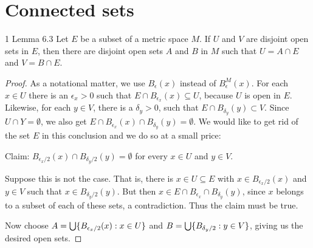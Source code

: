 \section{Connected sets}


\begin{exercise}{1 Lemma 6.3}
Let $E$ be a subset of a metric space $M$.
If $U$ and $V$ are disjoint open sets in $E$, then there are disjoint open sets $A$ and $B$ in $M$ such that $U=A\cap E$ and $V=B\cap E$.
\end{exercise}
\begin{proof}
As a notational matter, we use $B_\epsilon(x)$ instead of $B_\epsilon^M(x)$.
For each $x\in U$ there is an $\epsilon_x>0$ such that $E\cap B_{\epsilon_x}(x)\subseteq U$, because $U$ is open in $E$.
Likewise, for each $y\in V$, there is a $\delta_y>0$, such that $E\cap B_{\delta_y}(y)\subset V$.
Since $U\cap Y = \emptyset$, we also get $E\cap B_{\epsilon_x}(x)\cap B_{\delta_y}(y) = \emptyset$.
We would like to get rid of the set $E$ in this conclusion and we do so at a small price:

Claim: $B_{\epsilon_x/2}(x)\cap B_{\delta_y/2}(y) = \emptyset$ for every $x\in U$ and $y\in V$. 

Suppose this is not the case.
That is, there is $x\in U\subseteq E$ with $x\in B_{\epsilon_x/2}(x)$ and $y\in V$ such that $x\in B_{\delta_y/2}(y)$.
But then $x\in E \cap B_{\epsilon_x} \cap B_{\delta_y}(y)$, since $x$ belongs to a subset of each of these sets, a contradiction.
Thus the claim must be true.

Now choose $A = \bigcup \{B_{\epsilon_x/2}(x): x\in U\}$ and $B = \bigcup\{B_{\delta_y/2}: y\in V\}$, giving us the desired open sets.
\end{proof} 

